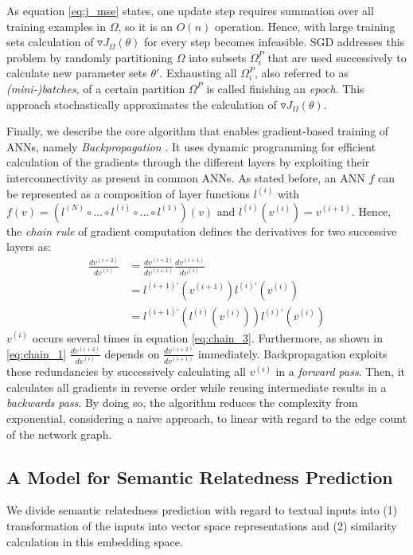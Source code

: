As equation \eqref{eq:j_mse} states, one update step requires summation over all training examples in $\Omega$, so it is an $O(n)$ operation. %
Hence, with large training sets calculation of $\triangledown J_\Omega(\theta)$ for every step becomes infeasible. \ac{SGD}  addresses this problem by randomly partitioning $\Omega$ into subsets $\Omega^P_i$ %
that are used successively to calculate new parameter sets $\theta'$. Exhausting all $\Omega^P_i$, also referred to as \textit{(mini-)batches}, of a certain partition $\Omega^P$ is called finishing an \textit{epoch}. This approach stochastically approximates the calculation of $\triangledown J_\Omega(\theta)$.

Finally, we describe the core algorithm that enables gradient-based training of \ac{ANN}s, namely \textit{Backpropagation} \autocite{rumelhart_learning_1988}. It uses dynamic programming for efficient calculation of the gradients through the different layers by exploiting their interconnectivity as present in common \ac{ANN}s. As stated before, an \ac{ANN} $f$ can be represented as a composition of layer functions $l^{(i)}$ with $f(v) = (l^{(N)} \circ ... \circ l^{(i)} \circ ... \circ l^{(1)})(v)$ and $l^{(i)}(v^{(i)}) = v^{(i+1)}$. Hence, the \textit{chain rule} of gradient computation defines the derivatives for two successive layers as:  
\begin{align}
  \frac{dv^{(i+2)}}{dv^{(i)}} & = \frac{dv^{(i+2)}}{dv^{(i+1)}}\frac{dv^{(i+1)}}{dv^{(i)}} \label{eq:chain_1}\\
    & = l^{(i+1)'}(v^{(i+1)})l^{(i)'}(v^{(i)}) \label{eq:chain_2}\\
    & = l^{(i+1)'}(l^{(i)}(v^{(i)}))l^{(i)'}(v^{(i)})  \label{eq:chain_3}
\end{align}
$v^{(i)}$ occurs several times in equation \eqref{eq:chain_3}. Furthermore, as shown in \eqref{eq:chain_1} $\frac{dv^{(i+2)}}{dv^{(i)}}$ depends on $\frac{dv^{(i+2)}}{dv^{(i+1)}}$ immediately. Backpropagation exploits these redundancies by successively calculating all $v^{(i)}$ in a \textit{forward pass}. Then, it calculates all gradients in reverse order while reusing intermediate results in a \textit{backwards pass}. By doing so, the algorithm reduces the complexity from exponential, considering a naive approach, to linear with regard to the edge count of the network graph.

\subsection{A Model for Semantic Relatedness Prediction}
We divide semantic relatedness prediction with regard to textual inputs into (1) transformation of the inputs into vector space representations and 
(2) similarity calculation in this embedding space.

